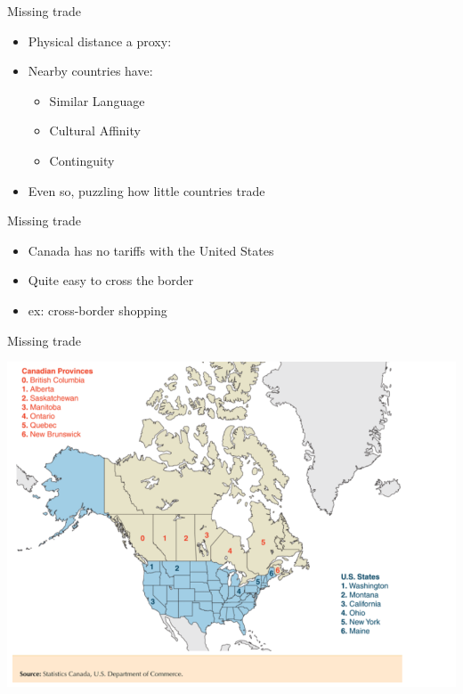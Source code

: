 \documentclass[ignorenonframetext,]{beamer}
\begin{document}
\begin{frame}{Missing trade}

    \begin{itemize}
        \item Physical distance a proxy:
        \item Nearby countries have:
        \begin{itemize}
            \item Similar Language
            \item Cultural Affinity
            \item Continguity 
        \end{itemize}
        \item Even so, puzzling how little countries trade
    \end{itemize}

\end{frame}

\begin{frame}{Missing trade}
    
    \begin{itemize}
        \item Canada has no tariffs with the United States
        \item Quite easy to cross the border
        \item ex: cross-border shopping
    \end{itemize}

\end{frame}

\begin{frame}{Missing trade}
    
    \includegraphics[scale=0.35]{canada_map.png}

\end{frame}
\end{document}
